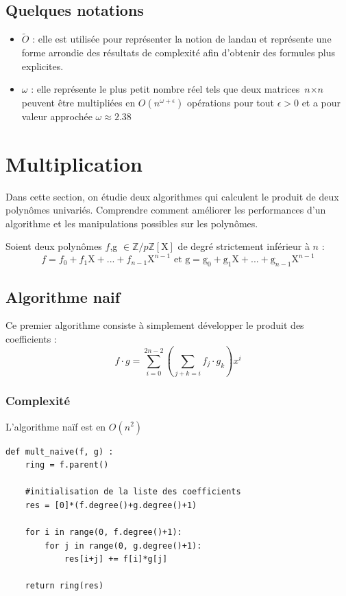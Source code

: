 \documentclass[a4paper]{article}
\begin{document}
 \subsection{Quelques notations}
 \begin{itemize}
 \item \textbf{$\tilde{O}$} : elle est utilisée pour représenter la notion de landau et représente une forme arrondie des résultats de complexité afin d'obtenir des formules plus explicites.
 \item \textbf{$\omega$} : elle représente le plus petit nombre réel tels que deux matrices $\textit{n}\times\textit{n}$ peuvent être multipliées en $O(\textit{n}^{\omega+\epsilon})$ opérations pour tout $\epsilon>0$ et a pour valeur approchée $\omega\approx2.38$

 
 \end{itemize}


\section{Multiplication}

Dans cette section, on étudie deux algorithmes qui calculent le produit de deux polynômes univariés.
Comprendre comment améliorer les performances d'un algorithme et les manipulations possibles sur les polynômes.


Soient deux polynômes $f$,g $\in \mathbb{Z}/p\mathbb{Z}[\mathrm{X}]$ de degré strictement inférieur à $n$ :
\[
f=f_0+f_1\mathrm{X}+...+f_{n-1}\mathrm{X}^{n-1}\text{ et g}=\mathrm{g}_0+\mathrm{g}_1\mathrm{X}+...+\mathrm{g}_{n-1}\mathrm{X}^{n-1}
\]

\subsection{Algorithme naif}

Ce premier algorithme consiste à simplement développer le produit des coefficients :
\[
f\cdot g=\sum_{i=0}^{2n-2} (\sum_{j+k=i}f_j\cdot g_k) x^i
\]

\subsubsection*{Complexité}
L'algorithme naïf est en $O(n^2)$

\begin{lstlisting}[title={multiplication naive}]
    def mult_naive(f, g) :
    ring = f.parent()

    #initialisation de la liste des coefficients
    res = [0]*(f.degree()+g.degree()+1) 
    
    for i in range(0, f.degree()+1):
        for j in range(0, g.degree()+1):
            res[i+j] += f[i]*g[j]

    return ring(res) 
\end{lstlisting}
\end{document}
